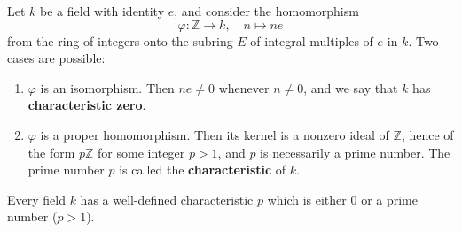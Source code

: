 Let $k$ be a field with identity $e$, and consider the homomorphism
$$
\varphi: \mathbb{Z} \to k, \quad n \mapsto ne
$$
from the ring of integers onto the subring $E$ of integral multiples of $e$ in $k$. Two cases are possible:
\begin{enumerate}
\item[(a)] $\varphi$ is an isomorphism. Then $ne \neq 0$ whenever $n \neq 0$, and we say that $k$ has \textbf{characteristic zero}.
\item[(b)] $\varphi$ is a proper homomorphism. Then its kernel is a nonzero ideal of $\mathbb{Z}$, hence of the form $p\mathbb{Z}$ for some integer $p > 1$, and $p$ is necessarily a prime number. The prime number $p$ is called the \textbf{characteristic} of $k$.
\end{enumerate}
Every field $k$ has a well-defined characteristic $p$ which is either $0$ or a prime number ($p > 1$).
